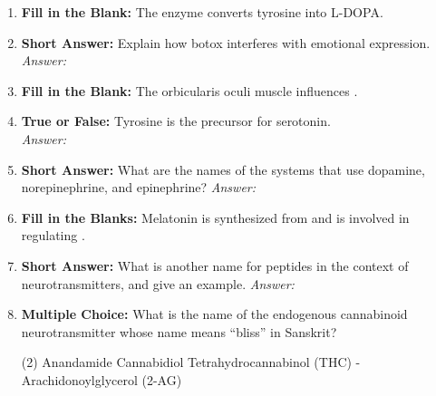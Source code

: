 \begin{enumerate}[label=\textbf{Q3.3.\arabic*}]
    \item \textbf{Fill in the Blank:} The enzyme \underline{\hspace{3cm}} converts tyrosine into L-DOPA.

    \item \textbf{Short Answer:} Explain how botox interferes with emotional expression. \\
        \textit{Answer:} %

    \item \textbf{Fill in the Blank:} The orbicularis oculi muscle influences \underline{\hspace{3cm}}. 

    \item \textbf{True or False:} Tyrosine is the precursor for serotonin. \\
        \textit{Answer:} %

    \item \textbf{Short Answer:} What are the names of the systems that use dopamine, norepinephrine, and epinephrine?  
        \textit{Answer:} %

    \item \textbf{Fill in the Blanks:} Melatonin is synthesized from \underline{\hspace{3cm}} and is involved in regulating \underline{\hspace{3cm}}.

    \item \textbf{Short Answer:} What is another name for peptides in the context of neurotransmitters, and give an example.  
        \textit{Answer:} %

    \item \textbf{Multiple Choice:} What is the name of the endogenous cannabinoid neurotransmitter whose name means ``bliss'' in Sanskrit?
        \begin{tasks}[label=\textcolor{\documentTheme}{(\Alph*)}, item-format=\color{\documentTheme}, label-width=1.5em, item-indent=1.7em](2)
            \task Anandamide
            \task Cannabidiol
            \task Tetrahydrocannabinol (THC)
            -Arachidonoylglycerol (2-AG)
        \end{tasks}


\end{enumerate}
